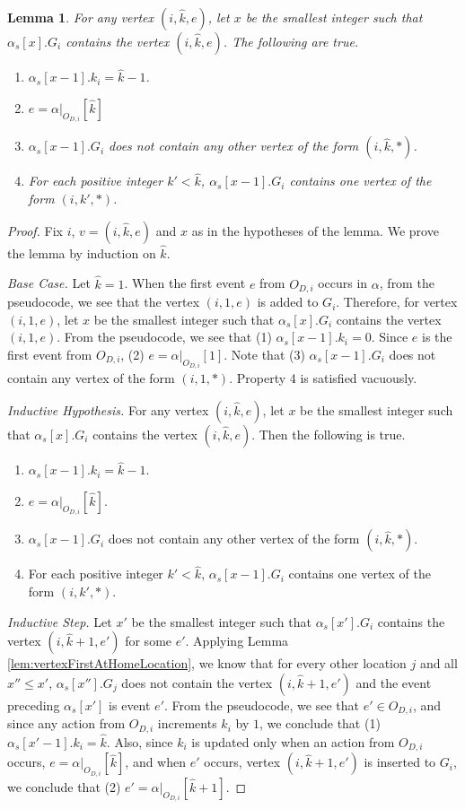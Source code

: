 \documentclass[11pt]{article}
\numberwithin{theorem}{section}
\newtheorem{lemma}[theorem]{Lemma}
\begin{document}
 \begin{lemma}\label{lem:vertexInsertionProp}
 For any vertex $(i,\hat{k},e)$, let $x$ be the smallest integer such that $\alpha_s[x].G_i$ contains the vertex $(i,\hat{k},e)$.
The following are true.
\begin{enumerate}
\item $\alpha_s[x-1].k_i = \hat{k}-1$.
\item $e = \alpha|_{O_{D,i}}[\hat{k}]$
\item $\alpha_s[x-1].G_i$ does not contain any other vertex of the form $(i,\hat{k},*)$.
\item For each positive integer $k' < \hat{k}$, $\alpha_s[x-1].G_i$ contains one vertex of the form $(i,k',*)$.
\end{enumerate}
\end{lemma}
\begin{proof}
Fix $i$, $v=(i,\hat{k},e)$ and $x$ as in the hypotheses of the lemma. We prove the lemma by induction on $\hat{k}$.

\emph{Base Case.} Let $\hat{k}=1$. When the first event $e$ from $O_{D,i}$
occurs in $\alpha$, from the pseudocode, we see that the vertex
$(i,1,e)$ is added to $G_i$. Therefore, for vertex $(i,1,e)$, let $x$
be the smallest integer such that $\alpha_s[x].G_i$ contains the
vertex $(i,1,e)$. From the pseudocode, we see that (1) $\alpha_s[x-1].k_i = 0$.
Since $e$ is the first event from $O_{D,i}$, (2) $e = \alpha|_{O_{D,i}}[1]$. Note that (3) $\alpha_s[x-1].G_i$ does not contain any vertex of the form $(i,1,*)$. Property 4 is satisfied vacuously.

\emph{Inductive Hypothesis.}  For any vertex $(i,\hat{k},e)$, let $x$ be the
smallest integer such that $\alpha_s[x].G_i$ contains the vertex
$(i,\hat{k},e)$. Then the following is true.
\begin{enumerate}
\item $\alpha_s[x-1].k_i = \hat{k}-1$.
\item $e = \alpha|_{O_{D,i}}[\hat{k}]$.
\item $\alpha_s[x-1].G_i$ does not contain any other vertex of the form $(i,\hat{k},*)$.
\item For each positive integer $k' < \hat{k}$, $\alpha_s[x-1].G_i$ contains one vertex of the form $(i,k',*)$.
\end{enumerate}

\emph{Inductive Step.} 
Let $x'$ be the smallest integer such that $\alpha_s[x'].G_i$ contains the vertex
$(i,\hat{k}+1,e')$ for some $e'$. Applying Lemma \ref{lem:vertexFirstAtHomeLocation}, we know that for every other location $j$ and all $x'' \leq x'$, $\alpha_s[x''].G_j$ does not contain the vertex $(i,\hat{k}+1,e')$ and the event preceding $\alpha_s[x']$ is event $e'$.
From the pseudocode, we see that $e' \in O_{D,i}$, and since any action from $O_{D,i}$ increments $k_i$ by $1$, we conclude that (1) $\alpha_s[x'-1].k_i = \hat{k}$. Also, since $k_i$ is updated only when an action from $O_{D,i}$ occurs, $e = \alpha|_{O_{D,i}}[\hat{k}]$, and when $e'$ occurs, vertex $(i,\hat{k}+1,e')$ is inserted to $G_i$, we conclude that (2) $e' = \alpha|_{O_{D,i}}[\hat{k}+1]$. 


\end{proof}
\end{document}
